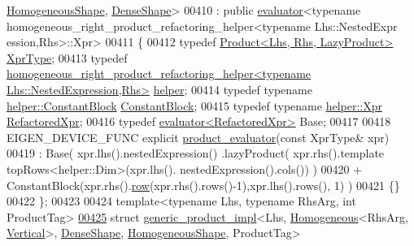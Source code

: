\begin{DoxyCode}
      \hyperlink{struct_eigen_1_1_homogeneous_shape}{HomogeneousShape}, \hyperlink{struct_eigen_1_1_dense_shape}{DenseShape}>
00410  : \textcolor{keyword}{public} \hyperlink{struct_eigen_1_1internal_1_1evaluator}{evaluator}<typename homogeneous\_right\_product\_refactoring\_helper<typename Lhs::NestedExpr
      ession,Rhs>::Xpr>
00411 \{
00412   \textcolor{keyword}{typedef} \hyperlink{group___core___module_class_eigen_1_1_product}{Product<Lhs, Rhs, LazyProduct>} \hyperlink{group___core___module_class_eigen_1_1_product}{XprType};
00413   \textcolor{keyword}{typedef} 
      \hyperlink{struct_eigen_1_1internal_1_1homogeneous__right__product__refactoring__helper}{homogeneous\_right\_product\_refactoring\_helper<typename Lhs::NestedExpression,Rhs>}
       \hyperlink{struct_eigen_1_1internal_1_1homogeneous__right__product__refactoring__helper}{helper};
00414   \textcolor{keyword}{typedef} \textcolor{keyword}{typename} \hyperlink{group___core___module_class_eigen_1_1_replicate}{helper::ConstantBlock} \hyperlink{group___core___module_class_eigen_1_1_replicate}{ConstantBlock};
00415   \textcolor{keyword}{typedef} \textcolor{keyword}{typename} \hyperlink{group___core___module_class_eigen_1_1_cwise_binary_op}{helper::Xpr} \hyperlink{group___core___module_class_eigen_1_1_cwise_binary_op}{RefactoredXpr};
00416   \textcolor{keyword}{typedef} \hyperlink{struct_eigen_1_1internal_1_1evaluator}{evaluator<RefactoredXpr>} Base;
00417   
00418   EIGEN\_DEVICE\_FUNC \textcolor{keyword}{explicit} \hyperlink{struct_eigen_1_1internal_1_1product__evaluator}{product\_evaluator}(\textcolor{keyword}{const} XprType& xpr)
00419     : Base(  xpr.lhs().nestedExpression() .lazyProduct(  xpr.rhs().template topRows<helper::Dim>(xpr.lhs().
      nestedExpression().cols()) )
00420             + ConstantBlock(xpr.rhs().\hyperlink{group___sparse_core___module_ae88b0ad6d31daa53e298b9cc4201fdee}{row}(xpr.rhs().rows()-1),xpr.lhs().rows(), 1) )
00421   \{\}
00422 \};
00423 
00424 \textcolor{keyword}{template}<\textcolor{keyword}{typename} Lhs, \textcolor{keyword}{typename} RhsArg, \textcolor{keywordtype}{int} ProductTag>
\hyperlink{struct_eigen_1_1internal_1_1generic__product__impl_3_01_lhs_00_01_homogeneous_3_01_rhs_arg_00_014b037163b7cbbe39357e3613dfc53e44}{00425} \textcolor{keyword}{struct }\hyperlink{struct_eigen_1_1internal_1_1generic__product__impl}{generic\_product\_impl}<Lhs, \hyperlink{group___geometry___module_class_eigen_1_1_homogeneous}{Homogeneous}<RhsArg,
      \hyperlink{group__enums_ggad49a7b3738e273eb00932271b36127f7addca718e0564723df21d61b94b1198be}{Vertical}>, \hyperlink{struct_eigen_1_1_dense_shape}{DenseShape}, \hyperlink{struct_eigen_1_1_homogeneous_shape}{HomogeneousShape}, ProductTag>

\end{DoxyCode}
